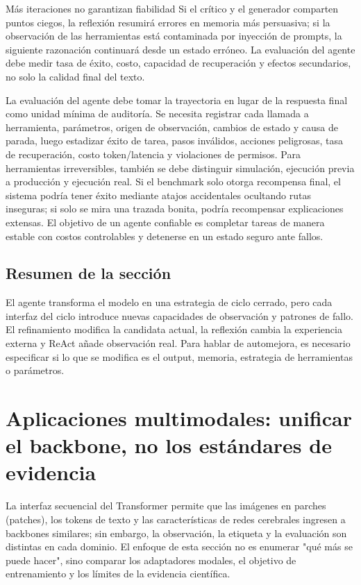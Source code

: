 \documentclass[a4paper]{article}
\begin{document}
\begin{warningbox}{Más iteraciones no garantizan fiabilidad}
Si el crítico y el generador comparten puntos ciegos, la reflexión resumirá errores en memoria más persuasiva; si la observación de las herramientas está contaminada por inyección de prompts, la siguiente razonación continuará desde un estado erróneo. La evaluación del agente debe medir tasa de éxito, costo, capacidad de recuperación y efectos secundarios, no solo la calidad final del texto.
\end{warningbox}

La evaluación del agente debe tomar la trayectoria en lugar de la respuesta final como unidad mínima de auditoría. Se necesita registrar cada llamada a herramienta, parámetros, origen de observación, cambios de estado y causa de parada, luego estadizar éxito de tarea, pasos inválidos, acciones peligrosas, tasa de recuperación, costo token/latencia y violaciones de permisos. Para herramientas irreversibles, también se debe distinguir simulación, ejecución previa a producción y ejecución real. Si el benchmark solo otorga recompensa final, el sistema podría tener éxito mediante atajos accidentales ocultando rutas inseguras; si solo se mira una trazada bonita, podría recompensar explicaciones extensas. El objetivo de un agente confiable es completar tareas de manera estable con costos controlables y detenerse en un estado seguro ante fallos.

\subsection{Resumen de la sección}

El agente transforma el modelo en una estrategia de ciclo cerrado, pero cada interfaz del ciclo introduce nuevas capacidades de observación y patrones de fallo. El refinamiento modifica la candidata actual, la reflexión cambia la experiencia externa y ReAct añade observación real. Para hablar de automejora, es necesario especificar si lo que se modifica es el output, memoria, estrategia de herramientas o parámetros.

\section{Aplicaciones multimodales: unificar el backbone, no los estándares de evidencia}

La interfaz secuencial del Transformer permite que las imágenes en parches (patches), los tokens de texto y las características de redes cerebrales ingresen a backbones similares; sin embargo, la observación, la etiqueta y la evaluación son distintas en cada dominio. El enfoque de esta sección no es enumerar "qué más se puede hacer", sino comparar los adaptadores modales, el objetivo de entrenamiento y los límites de la evidencia científica.
\end{document}
